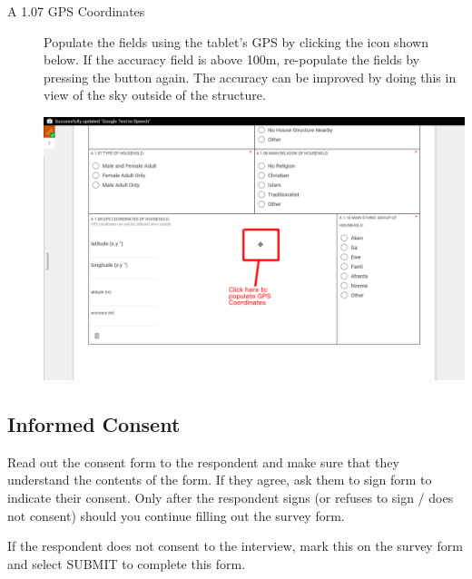 \documentclass[a4paper]{refart}
\begin{document}
\begin{description}
\item[A 1.07 GPS Coordinates] Populate the fields using the tablet's GPS by clicking the icon shown below. If the accuracy field is above 100m, re-populate the fields by pressing the button again. The accuracy can be improved by doing this in view of the sky outside of the structure.

\includegraphics[width=\textwidth]{enketo2.png}


\end{description}

\subsection{Informed Consent}
Read out the consent form to the respondent and make sure that they understand the contents of the form. If they agree, ask them to sign form to indicate their consent. Only after the respondent signs (or refuses to sign / does not consent) should you continue filling out the survey form.

If the respondent does not consent to the interview, mark this on the survey form and select SUBMIT to complete this form.
\end{document}
